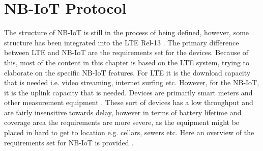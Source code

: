 \chapter{NB-IoT Protocol}\label{ch:NB-IoT}

The structure of \gls{NB-IoT} is still in the process of being defined, however, some structure has been integrated into the \gls{LTE} Rel-13 \citep{REL-13}. The primary difference between \gls{LTE} and \gls{NB-IoT} are the requirements set for the devices. Because of this, most of the content in this chapter is based on the \gls{LTE} system, trying to elaborate on the specific \gls{NB-IoT} features. For \gls{LTE} it is the download capacity that is needed i.e. video streaming, internet surfing etc. However, for the \gls{NB-IoT}, it is the uplink capacity that is needed. Devices are primarily smart meters and other measurement equipment \citep{primer}. These sort of devices has a low throughput and are fairly insensitive towards delay, however in terms of battery lifetime and coverage area the requirements are more severe, as the equipment might be placed in hard to get to location e.g. cellars, sewers etc. Here an overview of the requirements set for \gls{NB-IoT} is provided \citep{NB-IoT_Book}.

